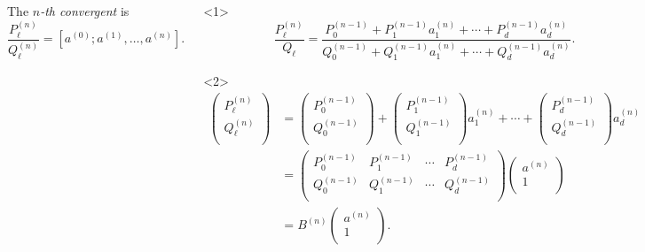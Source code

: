 \documentclass[aspectratio=169]{beamer}
\begin{document}
\begin{frame}
\begin{columns}[T]
    The \emph{$n$-th convergent} is \[
      \frac{P_ℓ^{(n)}}{Q_ℓ^{(n)}} = [a^{(0)}; a^{(1)}, …, a^{(n)}].
    \]
    \begin{lemma}
      \begin{onlyenv}<1>
        \[
          \frac{P_ℓ^{(n)}}{Q_ℓ}
          = \frac{P_0^{(n-1)} + P_1^{(n-1)} a_1^{(n)} + ⋯ + P_d^{(n-1)} a_d^{(n)}}
                 {Q_0^{(n-1)} + Q_1^{(n-1)} a_1^{(n)} + ⋯ + Q_d^{(n-1)} a_d^{(n)}}.
        \]
      \end{onlyenv}
      \begin{onlyenv}<2>
        \begin{align*}
          \begin{pmatrix}
            P_ℓ^{(n)} \\
            Q_ℓ^{(n)} \\
          \end{pmatrix}
          & = \begin{pmatrix}
            P_0^{(n-1)} \\
            Q_0^{(n-1)} \\
          \end{pmatrix} +
          \begin{pmatrix}
            P_1^{(n-1)} \\
            Q_1^{(n-1)} \\
          \end{pmatrix} a_1^{(n)} + ⋯ +
          \begin{pmatrix}
            P_d^{(n-1)} \\
            Q_d^{(n-1)} \\
          \end{pmatrix} a_d^{(n)} \\
          & = \begin{pmatrix}
            P_0^{(n-1)} & P_1^{(n-1)} & ⋯ & P_d^{(n-1)} \\
            Q_0^{(n-1)} & Q_1^{(n-1)} & ⋯ & Q_d^{(n-1)} \\
          \end{pmatrix}
          \begin{pmatrix}
            a^{(n)} \\
            1 \\
          \end{pmatrix} \\
          & = B^{(n)}
          \begin{pmatrix}
            a^{(n)} \\
            1 \\
          \end{pmatrix}.
        \end{align*}
      \end{onlyenv}
    \end{lemma}
  \end{columns}
\end{frame}
\end{document}
